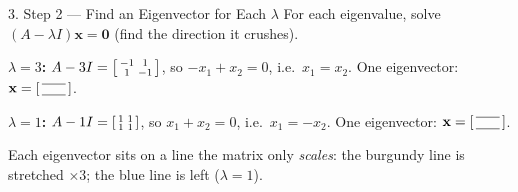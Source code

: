\documentclass[10pt]{article}
\newcommand{\xx}{\mathbf{x}}
\newcommand{\zero}{\mathbf{0}}
\begin{document}
\begin{notesbox}{3. Step 2 --- Find an Eigenvector for Each $\lambda$}
For each eigenvalue, solve $(A-\lambda I)\xx=\zero$ (find the direction it crushes).

\vspace{2pt}
\textbf{$\lambda=3$:}\quad
$A-3I=\begin{bsmallmatrix} -1 & 1\\ 1 & -1 \end{bsmallmatrix}$, so $-x_1+x_2=0$, i.e.\ $x_1=x_2$.
One eigenvector: $\xx=\begin{bsmallmatrix}\blank{0.6cm}\\[2pt]\blank{0.6cm}\end{bsmallmatrix}$.

\vspace{4pt}
\textbf{$\lambda=1$:}\quad
$A-1I=\begin{bsmallmatrix} 1 & 1\\ 1 & 1 \end{bsmallmatrix}$, so $x_1+x_2=0$, i.e.\ $x_1=-x_2$.
One eigenvector: $\xx=\begin{bsmallmatrix}\blank{0.6cm}\\[2pt]\blank{0.6cm}\end{bsmallmatrix}$.

\begin{center}
\end{center}
Each eigenvector sits on a line the matrix only \emph{scales}: the burgundy line is stretched
$\times3$; the blue line is left \blank{2.0cm} ($\lambda=1$).
\end{notesbox}
\end{document}
